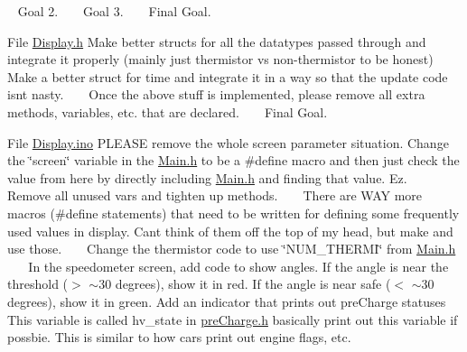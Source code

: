 \begin{DoxyRefList}
 ~\newline
 Goal 2. ~\newline
 ~\newline
 Goal 3. ~\newline
 ~\newline
 Final Goal.  
\item[File \mbox{\hyperlink{_display_8h}{Display.h}} ]\label{todo__todo000005}%
%
 Make better structs for all the datatypes passed through and integrate it properly (mainly just thermistor vs non-\/thermistor to be honest) ~\newline
 ~\newline
 Make a better struct for time and integrate it in a way so that the update code isn\textquotesingle{}t nasty. ~\newline
 ~\newline
 Once the above stuff is implemented, please remove all extra methods, variables, etc. that are declared. ~\newline
 ~\newline
 Final Goal.  
\item[File \mbox{\hyperlink{_display_8ino}{Display.ino}} ]\label{todo__todo000006}%
%
 PLEASE remove the whole screen parameter situation. Change the \char`\"{}screen\char`\"{} variable in the \mbox{\hyperlink{_main_8h}{Main.\+h}} to be a \#define macro and then just check the value from here by directly including \mbox{\hyperlink{_main_8h}{Main.\+h}} and finding that value. Ez. ~\newline
 ~\newline
 Remove all unused vars and tighten up methods. ~\newline
 ~\newline
 There are WAY more macros (\#define statements) that need to be written for defining some frequently used values in display. Can\textquotesingle{}t think of them off the top of my head, but make and use those. ~\newline
 ~\newline
 Change the thermistor code to use \char`\"{}\+NUM\+\_\+\+THERMI\char`\"{} from \mbox{\hyperlink{_main_8h}{Main.\+h}} ~\newline
 ~\newline
 In the speedometer screen, add code to show angles. If the angle is near the threshold (\texorpdfstring{$>$}{>} $\sim$30 degrees), show it in red. If the angle is near safe (\texorpdfstring{$<$}{<} $\sim$30 degrees), show it in green. Add an indicator that prints out pre\+Charge statuses This variable is called hv\+\_\+state in \mbox{\hyperlink{_precharge_8h}{pre\+Charge.\+h}} basically print out this variable if possbie. This is similar to how cars print out engine flags, etc.  

\end{DoxyRefList}

